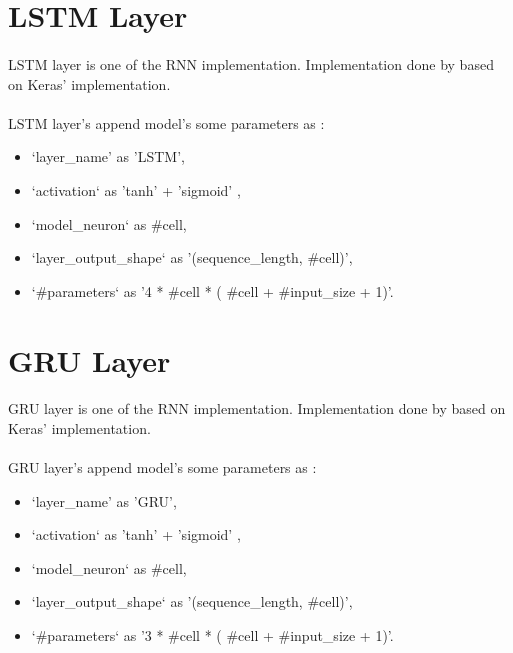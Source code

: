 \documentclass[12pt]{report}
\begin{document}
\section{LSTM Layer}

\paragraph{}
LSTM layer is one of the RNN implementation. Implementation done by \cite{MGK} based on Keras' \cite{Keras} implementation. 

\paragraph{}
LSTM layer's append model's some parameters as :
\begin{itemize}
	\item `layer\_name' as 'LSTM',
	\item `activation` as 'tanh' + 'sigmoid' ,
	\item `model\_neuron` as \#cell,
	\item `layer\_output\_shape` as '(sequence\_length, \#cell)',
	\item `\#parameters` as '4 * \#cell * ( \#cell + \#input\_size + 1)'.
\end{itemize}



\section{GRU Layer}

\paragraph{}
GRU layer is one of the RNN implementation. Implementation done by \cite{MGK} based on Keras' \cite{Keras} implementation. 

\paragraph{}
GRU layer's append model's some parameters as :
\begin{itemize}
	\item `layer\_name' as 'GRU',
	\item `activation` as 'tanh' + 'sigmoid' ,
	\item `model\_neuron` as \#cell,
	\item `layer\_output\_shape` as '(sequence\_length, \#cell)',
	\item `\#parameters` as '3 * \#cell * ( \#cell + \#input\_size + 1)'.
\end{itemize}
\end{document}
